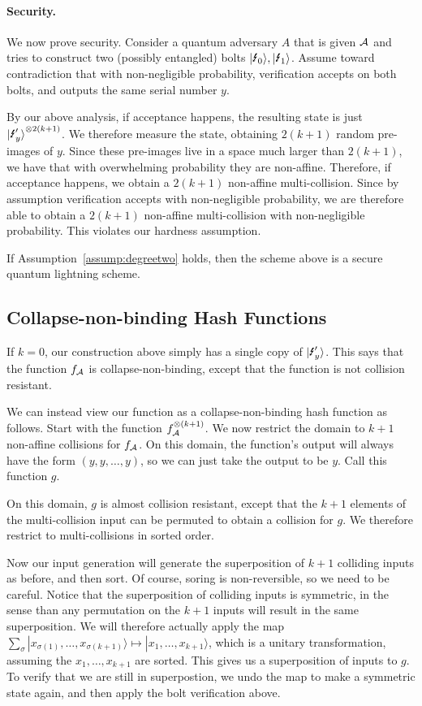 \paragraph{Security.} We now prove security.  Consider a quantum adversary $A$ that is given ${\mathcal{A}}$ and tries to construct two (possibly entangled) bolts $\qlightning[0],\qlightning[1]$.  Assume toward contradiction that with non-negligible probability, verification accepts on both bolts, and outputs the same serial number $y$.  

By our above analysis, if acceptance happens, the resulting state is just $\qlightningp[y]^{\otimes 2(k+1)}$.  We therefore measure the state, obtaining $2(k+1)$ random pre-images of $y$.  Since these pre-images live in a space much larger than $2(k+1)$, we have that with overwhelming probability they are non-affine.  Therefore, if acceptance happens, we obtain a $2(k+1)$ non-affine multi-collision.  Since by assumption verification accepts with non-negligible probability, we are therefore able to obtain a $2(k+1)$ non-affine multi-collision with non-negligible probability.  This violates our hardness assumption.

\begin{theorem} If Assumption~\ref{assump:degreetwo} holds, then the scheme above is a secure quantum lightning scheme.
\end{theorem}


\subsection{Collapse-non-binding Hash Functions}

If $k=0$, our construction above simply has a single copy of $\qlightningp[y]$.  This says that the function $f_{\mathcal{A}}$ is collapse-non-binding, except that the function is not collision resistant.


We can instead view our function as a collapse-non-binding hash function as follows.  Start with the function $f_{\mathcal{A}}^{\otimes(k+1)}$.  We now restrict the domain to $k+1$ non-affine collisions for $f_{\mathcal{A}}$.  On this domain, the function's output will always have the form $(y,y,\dots,y)$, so we can just take the output to be $y$.  Call this function $g$.

On this domain, $g$ is almost collision resistant, except that the $k+1$ elements of the multi-collision input can be permuted to obtain a collision for $g$.  We therefore restrict to multi-collisions in sorted order.

Now our input generation will generate the superposition of $k+1$ colliding inputs as before, and then sort.  Of course, soring is non-reversible, so we need to be careful.  Notice that the superposition of colliding inputs is symmetric, in the sense than any permutation on the $k+1$ inputs will result in the same superposition.  We will therefore actually apply the map $\sum_{\sigma} |x_{\sigma(1)},\dots,x_{\sigma(k+1)}\rangle \mapsto |x_1,\dots,x_{k+1}\rangle$, which is a unitary transformation, assuming the $x_1,\dots,x_{k+1}$ are sorted.  This gives us a superposition of inputs to $g$.  To verify that we are still in superpostion, we undo the map to make a symmetric state again, and then apply the bolt verification above.

